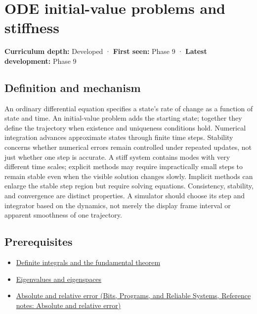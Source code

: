 \hypertarget{appendix-e8ab9836882e}{}\label{referencestart:appendix-e8ab9836882e}
\section{ODE initial-value problems and stiffness}\label{appendix-e8ab9836882e-ode-initial-value-problems-and-stiffness}

\textbf{Curriculum depth:} Developed · \textbf{First seen:} Phase 9 · \textbf{Latest development:} Phase 9

\subsection{Definition and mechanism}\label{appendix-e8ab9836882e-definition-and-mechanism}

An ordinary differential equation specifies a state's rate of change as a function of state and time. An initial-value problem adds the starting state; together they define the trajectory when existence and uniqueness conditions hold. Numerical integration advances approximate states through finite time steps. Stability concerns whether numerical errors remain controlled under repeated updates, not just whether one step is accurate. A stiff system contains modes with very different time scales; explicit methods may require impractically small steps to remain stable even when the visible solution changes slowly. Implicit methods can enlarge the stable step region but require solving equations. Consistency, stability, and convergence are distinct properties. A simulator should choose its step and integrator based on the dynamics, not merely the display frame interval or apparent smoothness of one trajectory.

\subsection{Prerequisites}\label{appendix-e8ab9836882e-prerequisites}

\begin{itemize}
\tightlist
\item
  \hyperref[appendix-1a50e72435c2]{Definite integrals and the fundamental theorem}
\item
  \hyperref[appendix-0b3be18411f9]{Eigenvalues and eigenspaces}
\item
  \href{../01-Bits-Programs-and-Reliable-Systems/main.pdf\#nameddest=appendix-3ae74e89b4e6}{Absolute and relative error (Bits, Programs, and Reliable Systems, Reference notes: Absolute and relative error)}
\end{itemize}

